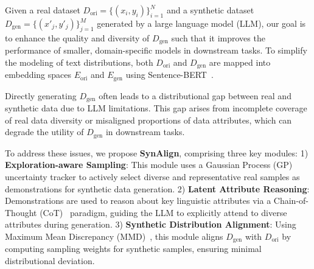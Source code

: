 


Given a real dataset $D_{\text{ori}} = \{(x_i, y_i)\}_{i=1}^N$ and a synthetic dataset $D_{\text{gen}} = \{(x'_j, y'_j)\}_{j=1}^M$ generated by a large language model (LLM), our goal is to enhance the quality and diversity of $D_{\text{gen}}$ such that it improves the performance of smaller, domain-specific models in downstream tasks. To simplify the modeling of text distributions, both $D_{\text{ori}}$ and $D_{\text{gen}}$ are mapped into embedding spaces $E_{\text{ori}}$ and $E_{\text{gen}}$ using Sentence-BERT~\cite{reimers2019sentence}.

Directly generating $D_{\text{gen}}$ often leads to a distributional gap between real and synthetic data due to LLM limitations. This gap arises from incomplete coverage of real data diversity or misaligned proportions of data attributes, which can degrade the utility of $D_{\text{gen}}$ in downstream tasks.

To address these issues, we propose \textbf{SynAlign}, comprising three key modules:
1) \textbf{Exploration-aware Sampling}: This module uses a Gaussian Process (GP) uncertainty tracker to actively select diverse and representative real samples as demonstrations for synthetic data generation.
2) \textbf{Latent Attribute Reasoning}: Demonstrations are used to reason about key linguistic attributes via a Chain-of-Thought (CoT)~\cite{wei2022chain} paradigm, guiding the LLM to explicitly attend to diverse attributes during generation.
3) \textbf{Synthetic Distribution Alignment}: Using Maximum Mean Discrepancy (MMD)~\cite{gretton2012kernel}, this module aligns $D_{\text{gen}}$ with $D_{\text{ori}}$ by computing sampling weights for synthetic samples, ensuring minimal distributional deviation.

